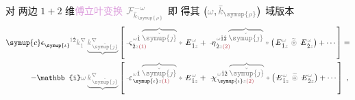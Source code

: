 对  两边 $1+2$ 维\textcolor{Plum}{傅立叶变换} $\mathcolor{gray}{\mathcal F_{\bar{k}_{\symup{\rho}}}^{-\omega}}$ 即  得其 $\left( \mathcolor{gray}{\omega}, \mathcolor{gray}{\bar{k}_{\symup{\rho}}} \right)$ 域版本
\begin{subequations}
\begin{align}
	{\symup{c}} \epsilon^{\hphantom{\symup{\iota}}\mathcolor{gray}{\dot{1}}\dot{2}}_{\symup{\iota}} \mathcolor{gray}{k^\nabla_{\dot{1}}} \mathcolor{gray}{\underbrace{k^\nabla_{\;\! \check{\symup{\jmath}}}}} &\left[ \Xint{\begin{smallmatrix} ~ \\ {}^{}_{\mathcolor{gray}{-}} \\ ~ \end{smallmatrix}}{13}{\varsigma}^{\;\! \mathcolor{gray}{\omega} \hat{1} \;\! \mathcolor{gray}{\overbrace{\check{\symup{\jmath}}}}}_{\;\! \dot{2} \mathcolor{gray}{z} \textcolor{Maroon}{(1)}} \mathcolor{gray}{*} \Xint{\mathcolor{gray}{-}}{295}{E}^{\;\!\mathcolor{gray}{\omega}}_{\;\! \hat{1} \mathcolor{gray}{z}} + \Xint{\begin{smallmatrix} ~ \\ {}^{}_{\mathcolor{gray}{-}} \\ ~ \end{smallmatrix}}{17}{\eta}^{\;\! \mathcolor{gray}{\omega} \hat{1} \hat{2} \;\! \mathcolor{gray}{\overbrace{\check{\symup{\jmath}}}}}_{\;\! \dot{2} \mathcolor{gray}{z} \textcolor{Maroon}{(2)}} \mathcolor{gray}{*} \left( \Xint{\mathcolor{gray}{-}}{295}{E}^{\;\!\mathcolor{gray}{\omega}}_{\;\! \hat{1} \mathcolor{gray}{z}} ~\mathcolor{gray}{\widetilde \circledast}~ \Xint{\mathcolor{gray}{-}}{295}{E}^{\;\!\mathcolor{gray}{\omega}}_{\;\! \hat{2} \mathcolor{gray}{z}} \right) + \cdots \right] \label{eq:wave_wkrho} = \\
	- \mathbb{i} \mathcolor{gray}{\omega} \mathcolor{gray}{\underbrace{k^\nabla_{\;\! \check{\symup{\jmath}}}}} &\left[ \Xint{\begin{smallmatrix} ~ \\ {}^{}_{\mathcolor{gray}{-}} \\ ~ \end{smallmatrix}}{16}{\varepsilon}^{\;\! \mathcolor{gray}{\omega} \hat{1} \;\! \mathcolor{gray}{\overbrace{\check{\symup{\jmath}}}}}_{\;\! \symup{\iota} \mathcolor{gray}{z} \textcolor{Maroon}{(1)}} \mathcolor{gray}{*} \Xint{\mathcolor{gray}{-}}{295}{E}^{\;\!\mathcolor{gray}{\omega}}_{\;\! \hat{1} \mathcolor{gray}{z}} + ~\Xint{{}^{}_{\mathcolor{gray}{-}}}{23}{\chi}^{\;\! \mathcolor{gray}{\omega} \hat{1} \hat{2} \;\! \mathcolor{gray}{\overbrace{\check{\symup{\jmath}}}}}_{\;\! \symup{\iota} \mathcolor{gray}{z} \textcolor{Maroon}{(2)}} \mathcolor{gray}{*} \left( \Xint{\mathcolor{gray}{-}}{295}{E}^{\;\!\mathcolor{gray}{\omega}}_{\;\! \hat{1} \mathcolor{gray}{z}} ~\mathcolor{gray}{\widetilde \circledast}~ \Xint{\mathcolor{gray}{-}}{295}{E}^{\;\!\mathcolor{gray}{\omega}}_{\;\! \hat{2} \mathcolor{gray}{z}} \right) + \cdots \right]~,
\end{align}
\end{subequations}
